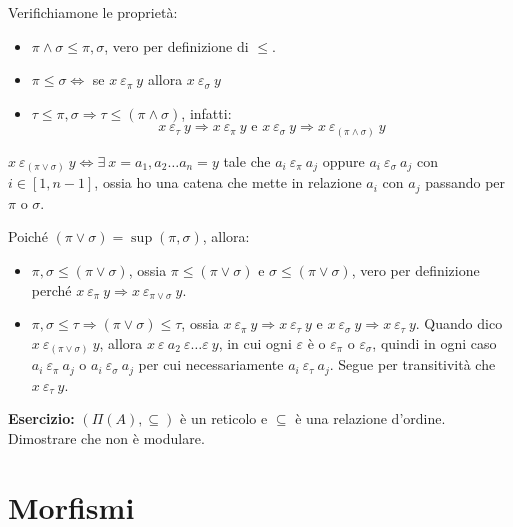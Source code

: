 Verifichiamone le propriet\`a:
\begin{itemize}
  \item $\pi \wedge \sigma \le \pi, \sigma$, vero per definizione di $\le$.
  \item $\pi \le \sigma \Leftrightarrow $ se $ x \ \varepsilon_{\pi} \ y $ allora $x \ \varepsilon_{\sigma} \ y$
  \item $\tau \le \pi, \sigma \Rightarrow \tau \le (\pi \wedge \sigma)$, infatti:
   \[
   x \ \varepsilon_{\tau} \ y \Rightarrow 
   x \ \varepsilon_{\pi} \ y \text{ e }
   x \ \varepsilon_{\sigma} \ y 
   \Rightarrow x \ \varepsilon_{(\pi \wedge \sigma)} \ y
   \]
\end{itemize}

\begin{defn}
$x \ \varepsilon_{(\pi \vee \sigma)} \ y \Leftrightarrow \exists \ x = a_1, a_2 \dots a_n = y $ tale che $a_i \ \varepsilon_{\pi} \ a_j$ oppure $a_i \ \varepsilon_{\sigma} \ a_j$ con $i \in [1, n-1]$, ossia ho una catena che mette in relazione $a_i$ con $a_j$ passando per $\pi$ o $\sigma$.
\end{defn}

Poich\'e $(\pi \vee \sigma) = \sup (\pi, \sigma)$, allora:
\begin{itemize}
  \item $\pi, \sigma \le (\pi \vee \sigma)$, ossia $\pi \le (\pi \vee \sigma)$ e $\sigma \le (\pi \vee \sigma)$, vero per definizione perch\'e $x \ \varepsilon_{\pi} \ y \Rightarrow x \ \varepsilon_{\pi \vee \sigma} \ y$.
  \item $\pi, \sigma \le \tau \Rightarrow (\pi \vee \sigma) \le \tau$, ossia $x \ \varepsilon_{\pi} \ y \Rightarrow x \ \varepsilon_{\tau} \ y$ e $x \ \varepsilon_{\sigma} \ y \Rightarrow x \ \varepsilon_{\tau} \ y$. Quando dico $x \ \varepsilon_{(\pi \vee \sigma)} \ y$, allora $x \ \varepsilon \ a_2 \ \varepsilon \dots \varepsilon \ y$, in cui ogni $\varepsilon$ \`e o $\varepsilon_{\pi}$ o $\varepsilon_{\sigma}$, quindi in ogni caso $a_i \ \varepsilon_{\pi} \ a_j$ o $a_i \ \varepsilon_{\sigma} \ a_j$ per cui necessariamente $a_i \ \varepsilon_{\tau} \ a_j$. Segue per transitivit\`a che $x \ \varepsilon_{\tau} \ y$.
\end{itemize}

\textbf{Esercizio:} $(\Pi(A), \subseteq)$ \`e un reticolo e $\subseteq$ \`e una relazione d'ordine. Dimostrare che non \`e modulare.
\vspace{5cm}

\section{Morfismi}

